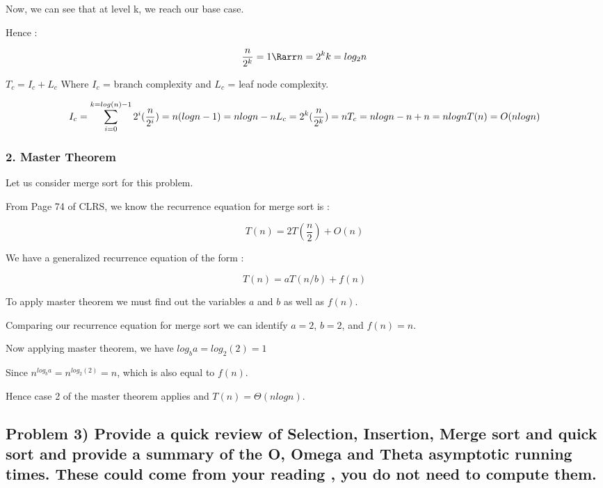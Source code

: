 \documentclass[
]{article}
\begin{document}
Now, we can see that at level k, we reach our base case.

Hence :

\[\frac{n}{2^k} = 1 \\ 

\Rarr n = 2^k \\

k = log_2n\\\]

\(T_c = I_c+L_c\) Where \(I_c\) = branch complexity and \(L_c\) = leaf
node complexity.

\[I_c = \sum_{i=0}^{k = log(n)-1} 2^i(\frac{n}{2^i}) = n(logn-1) = nlogn - n \\

L_c = 2^k(\frac{n}{2^k}) = n\\

T_c = nlogn - n +n = nlogn\\\\

T(n) = O(nlogn)\]

\subsubsection{2. Master Theorem}\label{2-master-theorem}

Let us consider merge sort for this problem.

From Page 74 of CLRS, we know the recurrence equation for merge sort is
:

\[T(n) = 2T(\frac{n}{2})+O(n)\]

We have a generalized recurrence equation of the form :

\[T(n) = aT(n/b) + f(n)\]

To apply master theorem we must find out the variables \(a\) and \(b\)
as well as \(f(n)\).

Comparing our recurrence equation for merge sort we can identify
\(a=2\), \(b =2\), and \(f(n) = n\).

Now applying master theorem, we have \(log_ba = log_2(2) = 1\)

Since \(n^{log_ba}= n^{log_2(2)} = n\), which is also equal to \(f(n)\).

Hence case 2 of the master theorem applies and \(T(n) = \Theta(nlogn)\).

\subsection{Problem 3) Provide a quick review of Selection, Insertion,
Merge sort and quick sort and provide a summary of the O, Omega and
Theta asymptotic running times. These could come from your reading , you
do not need to compute
them.}\label{problem-3-provide-a-quick-review-of-selection-insertion-merge-sort-and-quick-sort-and-provide-a-summary-of-the-o-omega-and-theta-asymptotic-running-times-these-could-come-from-your-reading--you-do-not-need-to-compute-them}
\end{document}
